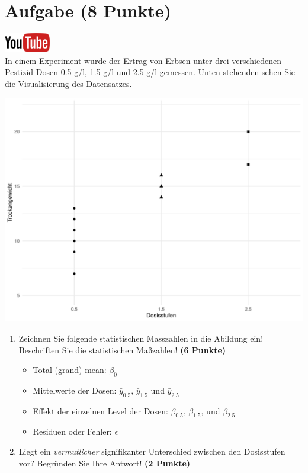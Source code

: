 \documentclass[a4paper, 10pt]{scrartcl}\usepackage[]{graphicx}\usepackage[]{xcolor}
\makeatletter
\def\maxwidth{ %
  \ifdim\Gin@nat@width>\linewidth
    \linewidth
  \else
    \Gin@nat@width
  \fi
}
\newenvironment{knitrout}{}{} %
\makeatother
\begin{document}
\section{Aufgabe \hfill (8 Punkte)}

\hfill\href{https://youtu.be/Q7xtQJoOmQI}{\includegraphics[width =
  2cm]{img/youtube}}\\[1Ex]

In einem Experiment wurde der Ertrag von Erbsen unter drei verschiedenen
Pestizid-Dosen 0.5 g/l, 1.5 g/l und 2.5 g/l gemessen. Unten stehenden sehen
Sie die Visualisierung des Datensatzes.

\begin{knitrout}
\color{fgcolor}

{\centering \includegraphics[width=\maxwidth]{img/anova-01-a-1} 

}


\end{knitrout}

\begin{enumerate}
\item Zeichnen Sie folgende statistischen Masszahlen in die Abildung ein!
  Beschriften Sie die statistischen Ma{\ss}zahlen! \textbf{(6 Punkte)}
  \begin{itemize}
  \item Total (grand) mean: $\beta_0$
  \item Mittelwerte der Dosen: $\bar{y}_{0.5}$, $\bar{y}_{1.5}$ und $\bar{y}_{2.5}$
  \item Effekt der einzelnen Level der Dosen: $\beta_{0.5}$, $\beta_{1.5}$,
    und $\beta_{2.5}$
  \item Residuen oder Fehler: $\epsilon$
  \end{itemize}
\item Liegt ein \textit{vermutlicher} signifikanter Unterschied zwischen
  den Dosisstufen vor? Begr{\"u}nden Sie Ihre Antwort! \textbf{(2 Punkte)}
\end{enumerate}
 
\end{document}
